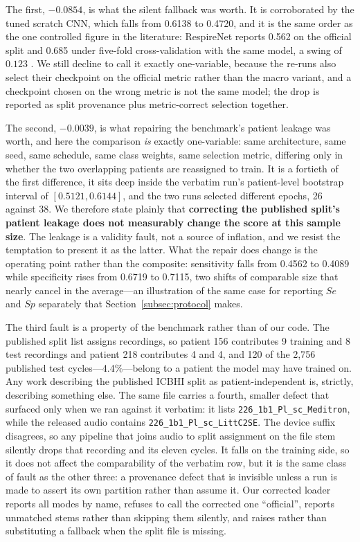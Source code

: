 \documentclass[journal,onecolumn]{IEEEtran}
\begin{document}
The first, $-0.0854$, is what the silent fallback was worth. It is corroborated by the
tuned scratch CNN, which falls from 0.6138 to 0.4720, and it is the same order as the
one controlled figure in the literature: RespireNet reports 0.562 on the official split
and 0.685 under five-fold cross-validation with the same model, a swing of $0.123$
\cite{respirenet2021}. We still decline to call it exactly one-variable, because the
re-runs also select their checkpoint on the official metric rather than the macro
variant, and a checkpoint chosen on the wrong metric is not the same model; the drop is
reported as split provenance plus metric-correct selection together.

The second, $-0.0039$, is what repairing the benchmark's patient leakage was worth, and
here the comparison \emph{is} exactly one-variable: same architecture, same seed, same
schedule, same class weights, same selection metric, differing only in whether the two
overlapping patients are reassigned to train. It is a fortieth of the first difference,
it sits deep inside the verbatim run's patient-level bootstrap interval of
$[0.5121, 0.6144]$, and the two runs selected different epochs, 26 against 38. We
therefore state plainly that \textbf{correcting the published split's patient leakage does
not measurably change the score at this sample size}. The leakage is a validity fault, not
a source of inflation, and we resist the temptation to present it as the latter. What the
repair does change is the operating point rather than the composite: sensitivity falls
from 0.4562 to 0.4089 while specificity rises from 0.6719 to 0.7115, two shifts of
comparable size that nearly cancel in the average---an illustration of the same case for
reporting $Se$ and $Sp$ separately that Section~\ref{subsec:protocol} makes.

The third fault is a property of the benchmark rather than of our code. The published
split list assigns recordings, so patient 156 contributes 9 training and 8 test
recordings and patient 218 contributes 4 and 4, and 120 of the 2{,}756 published test
cycles---4.4\%---belong to a patient the model may have trained on. Any work describing
the published ICBHI split as patient-independent is, strictly, describing something else.
The same file carries a fourth, smaller defect that surfaced only when we ran against it
verbatim: it lists \texttt{226\_1b1\_Pl\_sc\_Meditron}, while the released audio contains
\texttt{226\_1b1\_Pl\_sc\_LittC2SE}. The device suffix disagrees, so any pipeline that
joins audio to split assignment on the file stem silently drops that recording and its
eleven cycles. It falls on the training side, so it does not affect the comparability of
the verbatim row, but it is the same class of fault as the other three: a provenance
defect that is invisible unless a run is made to assert its own partition rather than
assume it. Our corrected loader reports all modes by name, refuses to call the corrected
one ``official'', reports unmatched stems rather than skipping them silently, and raises
rather than substituting a fallback when the split file is missing.
\end{document}
